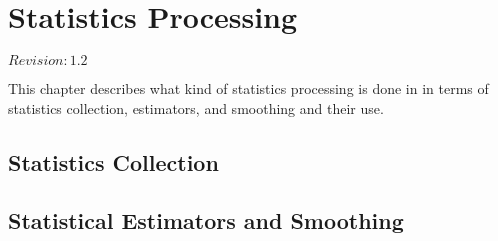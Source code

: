 %
%

\chapter{Statistics Processing}
\label{chapt:statistic-processing}

$Revision: 1.2 $

This chapter describes what kind of statistics
processing is done in {\marf} in terms of statistics collection,
estimators, and smoothing and their use.

{\todo}

\section{Statistics Collection}

{\todo}

\section{Statistical Estimators and Smoothing}

{\todo}

